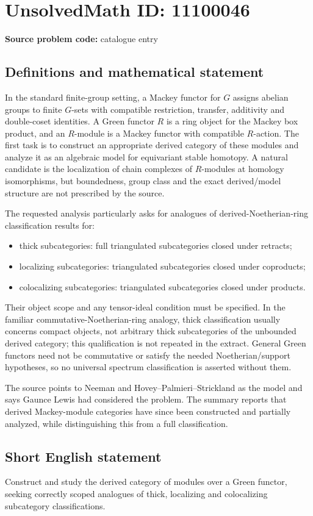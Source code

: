 \documentclass[11pt]{article}
\begin{document}
\section*{UnsolvedMath ID: 11100046}
\textbf{Source problem code:} catalogue entry
\subsection{Definitions and mathematical statement}
In the standard finite-group setting, a Mackey functor for \(G\) assigns abelian groups to finite \(G\)-sets with compatible restriction, transfer, additivity and double-coset identities. A Green functor \(R\) is a ring object for the Mackey box product, and an \(R\)-module is a Mackey functor with compatible \(R\)-action. The first task is to construct an appropriate derived category of these modules and analyze it as an algebraic model for equivariant stable homotopy. A natural candidate is the localization of chain complexes of \(R\)-modules at homology isomorphisms, but boundedness, group class and the exact derived/model structure are not prescribed by the source.

The requested analysis particularly asks for analogues of derived-Noetherian-ring classification results for:
\begin{itemize}
\item thick subcategories: full triangulated subcategories closed under retracts;
\item localizing subcategories: triangulated subcategories closed under coproducts;
\item colocalizing subcategories: triangulated subcategories closed under products.
\end{itemize}
Their object scope and any tensor-ideal condition must be specified. In the familiar commutative-Noetherian-ring analogy, thick classification usually concerns compact objects, not arbitrary thick subcategories of the unbounded derived category; this qualification is not repeated in the extract. General Green functors need not be commutative or satisfy the needed Noetherian/support hypotheses, so no universal spectrum classification is asserted without them.

The source points to Neeman and Hovey--Palmieri--Strickland as the model and says Gaunce Lewis had considered the problem. The summary reports that derived Mackey-module categories have since been constructed and partially analyzed, while distinguishing this from a full classification.
\subsection{Short English statement}
Construct and study the derived category of modules over a Green functor, seeking correctly scoped analogues of thick, localizing and colocalizing subcategory classifications.
\end{document}
